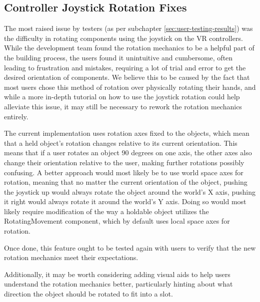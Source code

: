 \subsection{Controller Joystick Rotation Fixes}
\label{sec:ControllerJoystickRotationFixes}

The most raised issue by testers (as per subchapter \ref{sec:user-testing-results}) was the difficulty in rotating components using the joystick on the VR controllers.
While the development team found the rotation mechanics to be a helpful part of the building process, the users found it unintuitive and cumbersome, often leading to frustration and mistakes, requiring a lot of trial and error to get the desired orientation of components.
We believe this to be caused by the fact that most users chose this method of rotation over physically rotating their hands, and while a more in-depth tutorial on how to use the joystick rotation could help alleviate this issue, it may still be necessary to rework the rotation mechanics entirely.

The current implementation uses rotation axes fixed to the objects, which mean that a held object's rotation changes relative to its current orientation.
This means that if a user rotates an object 90 degrees on one axis, the other axes also change their orientation relative to the user, making further rotations possibly confusing.
A better approach would most likely be to use world space axes for rotation, meaning that no matter the current orientation of the object, pushing the joystick up would always rotate the object around the world's X axis, pushing it right would always rotate it around the world's Y axis.
Doing so would most likely require modification of the way a holdable object utilizes the RotatingMovement component, which by default uses local space axes for rotation.

Once done, this feature ought to be tested again with users to verify that the new rotation mechanics meet their expectations.

Additionally, it may be worth considering adding visual aids to help users understand the rotation mechanics better, particularly hinting about what direction the object should be rotated to fit into a slot.